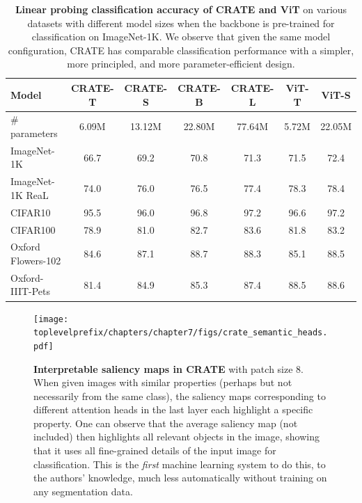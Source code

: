 \documentclass[../../book-main.tex]{subfiles}
\begin{document}
\begin{table}
    \centering
    \begin{tabular}{@{}lcccc|cc@{}}
    \toprule
    \textbf{Model} & CRATE-T  &  CRATE-S & CRATE-B & CRATE-L & { \color{gray} ViT-T} &  { \color{gray}ViT-S } \\ 
    \midrule
    \midrule
     \# parameters & 6.09M & 13.12M & 22.80M & 77.64M & { \color{gray} 5.72M} & { \color{gray} 22.05M} \\
    \midrule
     ImageNet-1K & 66.7 & 69.2 & 70.8 & 71.3 & { \color{gray} 71.5} & { \color{gray} 72.4} \\
     ImageNet-1K ReaL & 74.0 & 76.0 & 76.5 & 77.4 & { \color{gray} 78.3 } & { \color{gray} 78.4} \\
     CIFAR10 & 95.5 & 96.0 & 96.8 & 97.2 & { \color{gray} 96.6} & { \color{gray} 97.2} \\
     CIFAR100 & 78.9 & 81.0 & 82.7 & 83.6 & { \color{gray} 81.8} & { \color{gray} 83.2}\\
     Oxford Flowers-102 & 84.6 & 87.1 & 88.7 & 88.3 & { \color{gray} 85.1} & { \color{gray} 88.5}\\
     Oxford-IIIT-Pets & 81.4 & 84.9 & 85.3 & 87.4 & { \color{gray} 88.5} & { \color{gray} 88.6} \\
     \bottomrule
    \end{tabular}
    \caption{\small \textbf{Linear probing classification accuracy of CRATE and ViT} on various datasets with different model sizes when the backbone is pre-trained for classification on ImageNet-1K. We observe that given the same model configuration, CRATE has comparable classification performance with a simpler, more principled, and more parameter-efficient design.}
    \label{tab:crate_classification_linear_probing}
\end{table}

\begin{figure}[t]
    \centering
    \texttt{[image: \\toplevelprefix/chapters/chapter7/figs/crate\_semantic\_heads.pdf]}
    \caption{\small\textbf{Interpretable saliency maps in CRATE} with patch size \(8\). When given images with similar properties (perhaps but not necessarily from the same class), the saliency maps corresponding to different attention heads in the last layer each highlight a specific property. One can observe that the average saliency map (not included) then highlights all relevant objects in the image, showing that it uses all fine-grained details of the input image for classification. This is the \textit{first} machine learning system to do this, to the authors' knowledge, much less automatically without training on any segmentation data.}
    \label{fig:crate_semantic_heads}
\end{figure}
\end{document}
